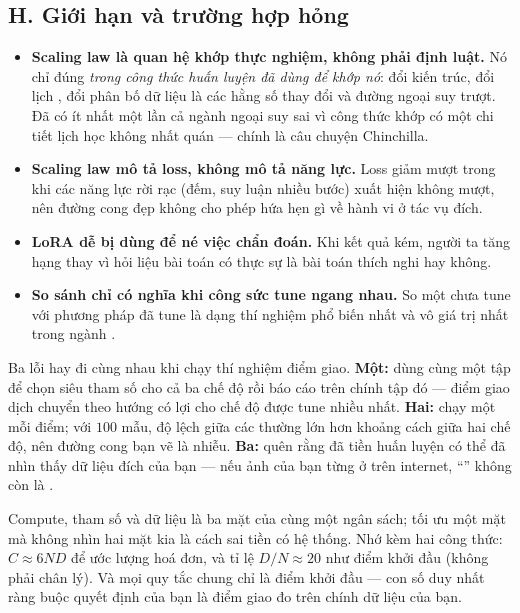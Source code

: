 \documentclass[../../../deep_learning.tex]{subfiles}
\begin{document}
\subsection{H. Giới hạn và trường hợp hỏng}
\begin{itemize}
\item \textbf{Scaling law là quan hệ khớp thực nghiệm, không phải định luật.} Nó chỉ đúng \emph{trong công thức huấn luyện đã dùng để khớp nó}: đổi kiến trúc, đổi lịch , đổi phân bố dữ liệu là các hằng số thay đổi và đường ngoại suy trượt. Đã có ít nhất một lần cả ngành ngoại suy sai vì công thức khớp có một chi tiết lịch học không nhất quán --- chính là câu chuyện Chinchilla.
\item \textbf{Scaling law mô tả loss, không mô tả năng lực.} Loss giảm mượt trong khi các năng lực rời rạc (đếm, suy luận nhiều bước) xuất hiện không mượt, nên đường cong đẹp không cho phép hứa hẹn gì về hành vi ở tác vụ đích.
\item \textbf{LoRA dễ bị dùng để né việc chẩn đoán.} Khi kết quả kém, người ta tăng hạng thay vì hỏi liệu bài toán có thực sự là bài toán thích nghi hay không.
\item \textbf{So sánh chỉ có nghĩa khi công sức tune ngang nhau.} So một  chưa tune với phương pháp đã tune là dạng thí nghiệm phổ biến nhất và vô giá trị nhất trong ngành \cite{dacrema2019worrying}.
\end{itemize}

\begin{cambay}
Ba lỗi hay đi cùng nhau khi chạy thí nghiệm điểm giao. \textbf{Một:} dùng cùng một tập  để chọn siêu tham số cho cả ba chế độ rồi báo cáo trên chính tập đó --- điểm giao dịch chuyển theo hướng có lợi cho chế độ được tune nhiều nhất. \textbf{Hai:} chạy một  mỗi điểm; với $100$ mẫu, độ lệch giữa các  thường lớn hơn khoảng cách giữa hai chế độ, nên đường cong bạn vẽ là nhiễu. \textbf{Ba:} quên rằng  đã tiền huấn luyện có thể đã nhìn thấy dữ liệu đích của bạn --- nếu ảnh của bạn từng ở trên internet, ``'' không còn là .
\end{cambay}

\begin{cannho}
Compute, tham số và dữ liệu là ba mặt của cùng một ngân sách; tối ưu một mặt mà không nhìn hai mặt kia là cách sai tiền có hệ thống. Nhớ kèm hai công thức: $C \approx 6ND$ để ước lượng hoá đơn, và tỉ lệ $D/N \approx 20$ như điểm khởi đầu (không phải chân lý). Và mọi quy tắc chung chỉ là điểm khởi đầu --- con số duy nhất ràng buộc quyết định của bạn là điểm giao đo trên chính dữ liệu của bạn. 
\end{cannho}
\end{document}
